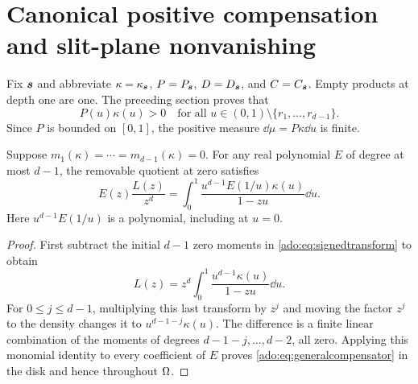 \section{Canonical positive compensation and slit-plane nonvanishing}
\label{ado:sec:compensation}
Fix $\boldsymbol{s}$ and abbreviate $\kappa=\kappa_{\boldsymbol{s}}$,
$P=P_{\boldsymbol{s}}$, $D=D_{\boldsymbol{s}}$, and $C=C_{\boldsymbol{s}}$. Empty products
at depth one are one. The preceding section proves that
\begin{equation}\label{ado:eq:positiveweight}
 P(u)\kappa(u)>0
 \quad\text{for all }u\in(0,1)\setminus\{r_1,\ldots,r_{d-1}\}.
\end{equation}
Since $P$ is bounded on $[0,1]$, the positive measure
$\dd\mu=P\kappa\dd u$ is finite.

\begin{lemma}
\label{ado:lem:polycancel}
Suppose $m_1(\kappa)=\cdots=m_{d-1}(\kappa)=0$. For any real
polynomial $E$ of degree at most $d-1$, the removable quotient at zero
satisfies
\begin{equation}\label{ado:eq:generalcompensator}
 E(z)\frac{L(z)}{z^d}
 =\int_0^1\frac{u^{d-1}E(1/u)\kappa(u)}{1-zu}\dd u.
\end{equation}
Here $u^{d-1}E(1/u)$ is a polynomial, including at $u=0$.
\end{lemma}
\begin{proof}
First subtract the initial $d-1$ zero moments in
\eqref{ado:eq:signedtransform} to obtain
\[
 L(z)=z^d\int_0^1\frac{u^{d-1}\kappa(u)}{1-zu}\dd u.
\]
For $0\le j\le d-1$, multiplying this last transform by $z^j$
and moving the factor $z^j$ to the density changes it to
$u^{d-1-j}\kappa(u)$. The difference is a finite linear combination
of the moments of degrees $d-1-j,\ldots,d-2$, all zero. Applying
this monomial identity to every coefficient of $E$ proves
\eqref{ado:eq:generalcompensator} in the disk and hence throughout $\Omega$.
\end{proof}

